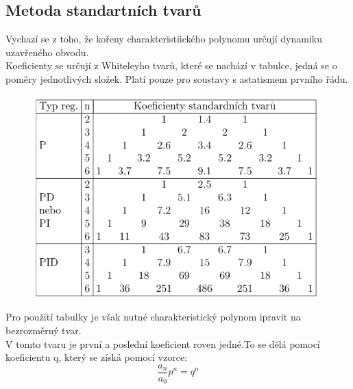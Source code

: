 \subsection*{Metoda standartních tvarů}
Vychazí se z toho, že kořeny charakteristiického polynomu určují dynamiku uzavřeného obvodu.\\
Koeficienty se určují z Whiteleyho tvarů, které se nachází v tabulce, jedná se o poměry jednotlivých složek. Platí pouze pro soustavy s astatismem prvního řádu.\\
\begin{figure}[H]
    \centering
    \includegraphics*[scale = 0.8]{images/metodaStandartnichTvaru.png}
\end{figure}
Pro použití tabulky je však nutné charakteristický polynom ipravit na bezrozměrný tvar.\\
V tomto tvaru je první a poslední koeficient roven jedné.To se dělá pomocí koeficientu q, který se získá pomocí vzorce:
\begin{equation}
    \frac{a_n}{a_0}p^n = q^n
\end{equation}
\newpage

